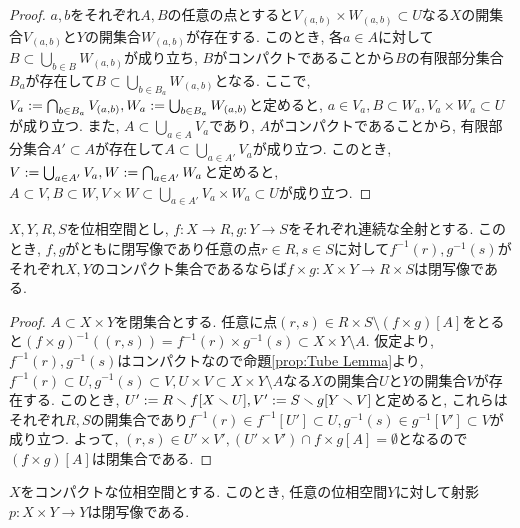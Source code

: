 \documentclass[uplatex, dvipdfmx, a4paper, 12pt, class=jsbook, crop=false]{standalone}
\begin{document}
\begin{proof}
	$ a, b $をそれぞれ$ A, B $の任意の点とすると$ V_{(a, b)} \times W_{(a, b)} \subset U $なる$ X $の開集合$ V_{(a, b)} $と$ Y $の開集合$ W_{(a, b)} $が存在する.
	このとき, 各$ a \in A $に対して$ B \subset \bigcup_{b \in B} W_{(a, b)} $が成り立ち, $ B $がコンパクトであることから$ B $の有限部分集合$ B_a $が存在して$ B \subset \bigcup_{b \in B_a} W_{(a, b)} $となる.
	ここで, $ V_a \mathrel{:=} \bigcap_{b \in B_a}V_{(a, b)} , W_a \mathrel{:=} \bigcup_{b \in B_a} W_{(a, b)} $と定めると, $ a \in V_a, B \subset W_a, V_a \times W_a \subset U $が成り立つ.
	また, $ A \subset \bigcup_{a \in A} V_a $であり, $ A $がコンパクトであることから, 有限部分集合$ A' \subset A $が存在して$ A \subset \bigcup_{a \in A'} V_a $が成り立つ.
	このとき, $ V \mathrel{:=} \bigcup_{a \in A'} V_a, W \mathrel{:=} \bigcap_{a \in A'} W_a $と定めると, $ A \subset V, B \subset W, V \times W \subset \bigcup_{a \in A'} V_a \times W_a \subset U $が成り立つ.
\end{proof}

\begin{theorem}
	\label{thm:Sufficient condition that the product of closed continuous surgections is closed}
	$ X, Y, R, S $を位相空間とし, $ f \colon X \to R, g \colon Y \to S $をそれぞれ連続な全射とする.
	このとき, $ f, g $がともに閉写像であり任意の点$ r \in R, s \in S $に対して$ f^{-1}(r), g^{-1}(s) $がそれぞれ$ X, Y $のコンパクト集合であるならば$ f \times g \colon X \times Y \to R \times S $は閉写像である.
\end{theorem}

\begin{proof}
	$ A \subset X \times Y $を閉集合とする.
	任意に点$ (r, s) \in R \times S \setminus (f \times g)[A] $をとると$ (f \times g)^{-1}((r, s)) = f^{-1}(r) \times g^{-1}(s) \subset X \times Y \setminus A $.
	仮定より, $ f^{-1}(r), g^{-1}(s) $はコンパクトなので命題\ref{prop:Tube Lemma}より, $ f^{-1}(r) \subset U, g^{-1}(s) \subset V, U \times V \subset X \times Y \setminus A $なる$ X $の開集合$ U $と$ Y $の開集合$ V $が存在する.
	このとき, $ U' \mathrel{:=} R \smallsetminus f[X \smallsetminus U], V' \mathrel{:=} S \smallsetminus g[Y \smallsetminus V] $と定めると, これらはそれぞれ$ R, S $の開集合であり$ f^{-1}(r) \in f^{-1}[U'] \subset U, g^{-1}(s) \in g^{-1}[V'] \subset V $が成り立つ.
	よって, $ (r, s) \in U' \times V', (U' \times V') \cap f \times g[A] = \emptyset $となるので$(f \times g)[A] $は閉集合である.
\end{proof}

\begin{corollary}
	\label{coro:Kuratowski-Mrowka Theorem}
	$ X $をコンパクトな位相空間とする.
	このとき, 任意の位相空間$ Y $に対して射影$ p \colon X \times Y \to Y $は閉写像である.
\end{corollary}
\end{document}
